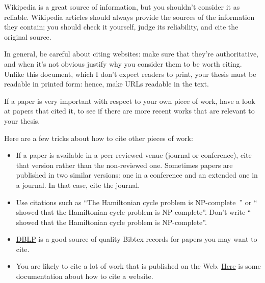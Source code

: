Wikipedia is a great source of information, but you shouldn't consider it as reliable.
Wikipedia articles should always provide the sources of the information they contain; you
should check it yourself, judge its reliability, and cite the original source.

In general, be careful about citing websites: make sure that they're authoritative, and when it's not obvious justify why you consider them to be worth citing. Unlike this document, which I don't expect readers to print, your thesis must be readable in printed form: hence, make URLs readable in the text.

If a paper is very important with respect to your own piece of work, have a look at papers
that cited it, to see if there are more recent works that are relevant to your thesis.

Here are a few tricks about how to cite other pieces of work:
\begin{itemize}
  \item If a paper is available in a peer-reviewed venue (journal or conference), cite that
  version rather than the non-reviewed one. Sometimes papers are published in two similar
  versions: one in a conference and an extended one in a journal. In that case, cite the
  journal.
  \item Use citations such as ``The Hamiltonian cycle problem is
  NP-complete~\cite{DBLP:conf/coco/Karp72}'' or ``\textcite{DBLP:conf/coco/Karp72} showed
  that the Hamiltonian cycle problem is NP-complete''. Don't write
  ``\cite{DBLP:conf/coco/Karp72} showed that the Hamiltonian cycle problem is NP-complete''.
  \item \href{https://dblp.org}{DBLP} is a good source of quality Bibtex records for papers
  you may want to cite.
  \item You are likely to cite a lot of work that is published on the Web.
  \href{https://bibtex.eu/faq/how-can-i-use-bibtex-to-cite-a-website/}{Here} is some
  documentation about how to cite a website.
\end{itemize}
